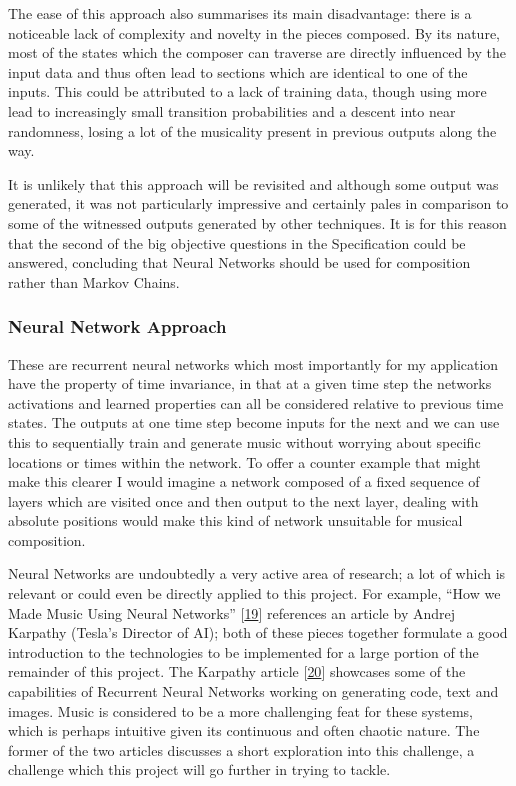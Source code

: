 \documentclass[12pt,]{article}
\begin{document}
The ease of this approach also summarises its main disadvantage: there
is a noticeable lack of complexity and novelty in the pieces composed.
By its nature, most of the states which the composer can traverse are
directly influenced by the input data and thus often lead to sections
which are identical to one of the inputs. This could be attributed to a
lack of training data, though using more lead to increasingly small
transition probabilities and a descent into near randomness, losing a
lot of the musicality present in previous outputs along the way.

It is unlikely that this approach will be revisited and although some
output was generated, it was not particularly impressive and certainly
pales in comparison to some of the witnessed outputs generated by other
techniques. It is for this reason that the second of the big objective
questions in the Specification could be answered, concluding that Neural
Networks should be used for composition rather than Markov Chains.

\hypertarget{neural-network-approach}{%
\subsubsection{Neural Network Approach}\label{neural-network-approach}}

These are recurrent neural networks which most importantly for my
application have the property of time invariance, in that at a given
time step the networks activations and learned properties can all be
considered relative to previous time states. The outputs at one time
step become inputs for the next and we can use this to sequentially
train and generate music without worrying about specific locations or
times within the network. To offer a counter example that might make
this clearer I would imagine a network composed of a fixed sequence of
layers which are visited once and then output to the next layer, dealing
with absolute positions would make this kind of network unsuitable for
musical composition.

Neural Networks are undoubtedly a very active area of research; a lot of
which is relevant or could even be directly applied to this project. For
example, ``How we Made Music Using Neural Networks''
{[}\protect\hyperlink{ref-alextavgen}{19}{]} references an article by
Andrej Karpathy (Tesla's Director of AI); both of these pieces together
formulate a good introduction to the technologies to be implemented for
a large portion of the remainder of this project. The Karpathy article
{[}\protect\hyperlink{ref-karpathy}{20}{]} showcases some of the
capabilities of Recurrent Neural Networks working on generating code,
text and images. Music is considered to be a more challenging feat for
these systems, which is perhaps intuitive given its continuous and often
chaotic nature. The former of the two articles discusses a short
exploration into this challenge, a challenge which this project will go
further in trying to tackle.
\end{document}
